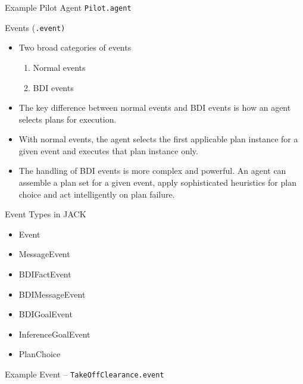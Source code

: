 \documentclass[aspectratio=1610,xcolor=dvipsnames,t]{beamer}
\newcommand{\showcode}[1]{\begin{mdframed}[style=code] %
                          \end{mdframed}%
}
\begin{document}
\begin{frame}{Example Pilot Agent \texttt{Pilot.agent}}
    \showcode{pilotagent.java} 
\end{frame} 

\begin{frame}{Events (\texttt{.event)} }
    \begin{itemize}
        \item Two broad categories of events
            \begin{enumerate}
                \item Normal events
                \item BDI events
            \end{enumerate} 

        \item The key difference between normal events and 
              BDI events is how an agent selects plans for execution.

        \item With normal events, the agent selects the first 
              applicable plan instance for a given event and executes 
              that plan instance only. 

        \item The handling of BDI events is more complex and powerful. 
              An agent can assemble a plan set for a given event, 
              apply sophisticated heuristics for plan choice and 
              act intelligently on plan failure. 
    \end{itemize} 
\end{frame} 

\begin{frame}{Event Types in JACK} 
    \begin{itemize}
        \item Event
        \item MessageEvent
        \item BDIFactEvent
        \item BDIMessageEvent
        \item BDIGoalEvent
        \item InferenceGoalEvent
        \item PlanChoice
    \end{itemize} 
\end{frame} 

\begin{frame}{Example Event -- \texttt{TakeOffClearance.event}}
    \showcode{takeoffevent.java} 
\end{frame} 
\end{document}
